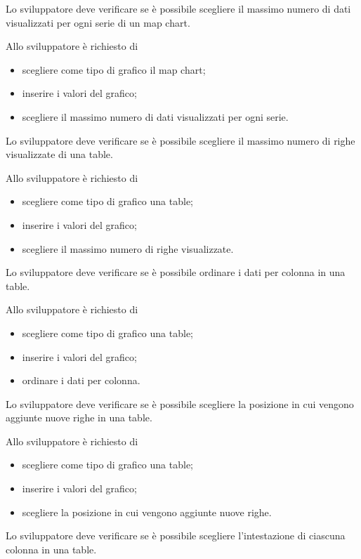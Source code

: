 	Lo sviluppatore deve verificare se è possibile scegliere il massimo numero di dati visualizzati per ogni serie di un map chart.

		Allo sviluppatore è richiesto di
		\begin{itemize}
			\item scegliere come tipo di grafico il map chart;
			\item inserire i valori del grafico;
			\item scegliere il massimo numero di dati visualizzati per ogni serie.
		\end{itemize}

	Lo sviluppatore deve verificare se è possibile scegliere il massimo numero di righe visualizzate di una table.

		Allo sviluppatore è richiesto di
		\begin{itemize}
			\item scegliere come tipo di grafico una table;
			\item inserire i valori del grafico;
			\item scegliere il massimo numero di righe visualizzate.
		\end{itemize}

	Lo sviluppatore deve verificare se è possibile ordinare i dati per colonna in una table.

		Allo sviluppatore è richiesto di
		\begin{itemize}
			\item scegliere come tipo di grafico una table;
			\item inserire i valori del grafico;
			\item ordinare i dati per colonna.
		\end{itemize}

	Lo sviluppatore deve verificare se è possibile scegliere la posizione in cui vengono aggiunte nuove righe in una table.

		Allo sviluppatore è richiesto di
		\begin{itemize}
			\item scegliere come tipo di grafico una table;
			\item inserire i valori del grafico;
			\item scegliere la posizione in cui vengono aggiunte nuove righe.
		\end{itemize}

	Lo sviluppatore deve verificare se è possibile scegliere l'intestazione di ciascuna colonna in una table.

